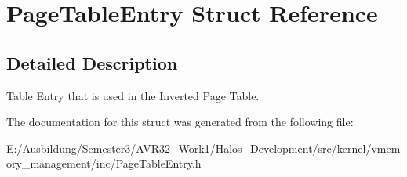 \hypertarget{struct_page_table_entry}{
\section{PageTableEntry Struct Reference}
\label{struct_page_table_entry}
}


\subsection{Detailed Description}
Table Entry that is used in the Inverted Page Table. 

The documentation for this struct was generated from the following file:\begin{CompactItemize}
\item 
E:/Ausbildung/Semester3/AVR32\_\-Work1/Halos\_\-Development/src/kernel/vmemory\_\-management/inc/PageTableEntry.h\end{CompactItemize}
